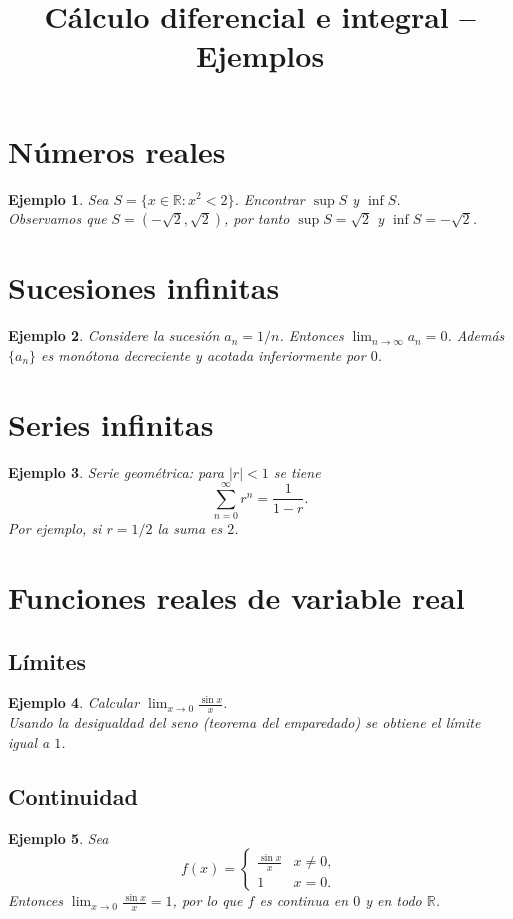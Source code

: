 \documentclass[12pt]{article}
\title{Cálculo diferencial e integral -- Ejemplos}
\author{}
\date{}
\newtheorem{example}{Ejemplo}[section]
\begin{document}
\maketitle

\tableofcontents
\newpage

\section{Números reales}
\begin{example}
Sea $S=\{x\in\mathbb{R}: x^2<2\}$. Encontrar $\sup S$ y $\inf S$.\\
Observamos que $S=(-\sqrt2,\sqrt2)$, por tanto $\sup S=\sqrt2$ y $\inf S=-\sqrt2$.
\end{example}

\section{Sucesiones infinitas}
\begin{example}
Considere la sucesión $a_n=1/n$. Entonces $\lim_{n\to\infty}a_n=0$. Además $\{a_n\}$ es monótona decreciente y acotada inferiormente por $0$.
\end{example}

\section{Series infinitas}
\begin{example}
Serie geométrica: para $|r|<1$ se tiene
$$\sum_{n=0}^{\infty}r^n=\frac{1}{1-r}.$$ 
Por ejemplo, si $r=1/2$ la suma es $2$.
\end{example}

\section{Funciones reales de variable real}
\subsection{Límites}
\begin{example}
Calcular $\displaystyle\lim_{x\to0}\frac{\sin x}{x}$.\\
Usando la desigualdad del seno (teorema del emparedado) se obtiene el límite igual a $1$.
\end{example}

\subsection{Continuidad}
\begin{example}
Sea
$$f(x)=\begin{cases}\frac{\sin x}{x}&x\neq0,\\1&x=0.\end{cases}$$
Entonces $\lim_{x\to0}\frac{\sin x}{x}=1$, por lo que $f$ es continua en $0$ y en todo $\mathbb{R}$.
\end{example}
\end{document}
